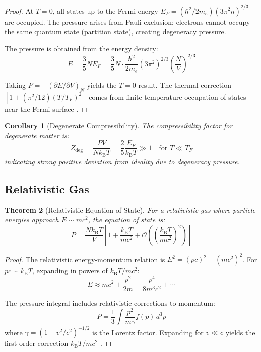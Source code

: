 \documentclass[11pt,twocolumn,a4paper]{article}
\newtheorem{theorem}{Theorem}[section]
\newtheorem{corollary}[theorem]{Corollary}
\theoremstyle{definition}
\theoremstyle{remark}
\newcommand{\kB}{k_{\mathrm{B}}}
\begin{document}
\begin{proof}
At $T = 0$, all states up to the Fermi energy $E_F = (\hbar^2/2m_e)(3\pi^2 n)^{2/3}$ are occupied. The pressure arises from Pauli exclusion: electrons cannot occupy the same quantum state (partition state), creating degeneracy pressure.

The pressure is obtained from the energy density:
\begin{equation}
E = \frac{3}{5}NE_F = \frac{3}{5}N \cdot \frac{\hbar^2}{2m_e}(3\pi^2)^{2/3} \left(\frac{N}{V}\right)^{2/3}
\end{equation}

Taking $P = -(\partial E/\partial V)_N$ yields the $T=0$ result. The thermal correction $[1 + (\pi^2/12)(T/T_F)^2]$ comes from finite-temperature occupation of states near the Fermi surface \citep{landau1980statistical,ashcroft1976solid}.
\end{proof}

\begin{corollary}[Degenerate Compressibility]
\label{cor:degenerate_compressibility}
The compressibility factor for degenerate matter is:
\begin{equation}
Z_{\mathrm{deg}} = \frac{PV}{N\kB T} = \frac{2}{5}\frac{E_F}{\kB T} \gg 1 \quad \text{for } T \ll T_F
\label{eq:degenerate_compressibility}
\end{equation}
indicating strong positive deviation from ideality due to degeneracy pressure.
\end{corollary}

\subsection{Relativistic Gas}

\begin{theorem}[Relativistic Equation of State]
\label{thm:relativistic_eos}
For a relativistic gas where particle energies approach $E \sim mc^2$, the equation of state is:
\begin{equation}
P = \frac{N\kB T}{V}\left[1 + \frac{\kB T}{mc^2} + \mathcal{O}\left(\left(\frac{\kB T}{mc^2}\right)^2\right)\right]
\label{eq:relativistic_eos}
\end{equation}
\end{theorem}

\begin{proof}
The relativistic energy-momentum relation is $E^2 = (pc)^2 + (mc^2)^2$. For $pc \sim \kB T$, expanding in powers of $\kB T/mc^2$:
\begin{equation}
E \approx mc^2 + \frac{p^2}{2m} + \frac{p^4}{8m^3c^2} + \cdots
\end{equation}

The pressure integral includes relativistic corrections to momentum:
\begin{equation}
P = \frac{1}{3}\int \frac{p^2}{m\gamma} f(p) \, d^3p
\end{equation}
where $\gamma = (1 - v^2/c^2)^{-1/2}$ is the Lorentz factor. Expanding for $v \ll c$ yields the first-order correction $\kB T/mc^2$ \citep{pathria2011statistical}.
\end{proof}
\end{document}
